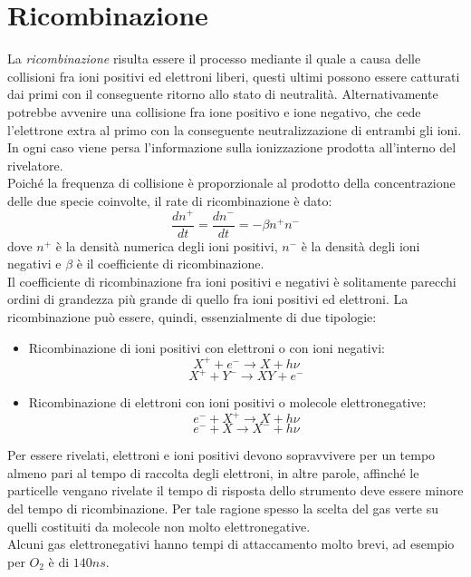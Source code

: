 \documentclass[12pt, letterpaper]{book}
\begin{document}
\section{Ricombinazione}
La \textit{ricombinazione} risulta essere il processo mediante il quale a causa delle collisioni fra ioni positivi ed elettroni liberi, questi ultimi possono essere catturati dai primi con il conseguente ritorno allo stato di neutralità. Alternativamente potrebbe avvenire una collisione fra ione positivo e ione negativo, che cede l'elettrone extra al primo con la conseguente neutralizzazione di entrambi gli ioni. In ogni caso viene persa l'informazione sulla ionizzazione prodotta all'interno del rivelatore.\\ 
Poiché la frequenza di collisione è proporzionale al prodotto della concentrazione delle due specie coinvolte, il rate di ricombinazione è dato:
$$\frac{dn^+}{dt}=\frac{dn^-}{dt}=-\beta n^+n^-$$
dove $n^+$ è la densità numerica degli ioni positivi, $n^-$ è la densità degli ioni negativi e $\beta$ è il coefficiente di ricombinazione.\\
Il coefficiente di ricombinazione fra ioni positivi e negativi è solitamente parecchi ordini di grandezza più grande di quello fra ioni positivi ed elettroni.
La ricombinazione può essere, quindi, essenzialmente di due tipologie:
\begin{itemize}
    \item Ricombinazione di ioni positivi con elettroni o con ioni negativi:
    $$X^++e^-\rightarrow X+h\nu$$
    $$X^++Y^-\rightarrow XY+e^-$$
    \item Ricombinazione di elettroni con ioni positivi o molecole elettronegative:
    $$e^-+X^+\rightarrow X+h\nu$$
    $$e^-+X\rightarrow X^-+h\nu$$
\end{itemize}
Per essere rivelati, elettroni e ioni positivi devono sopravvivere per un tempo almeno pari al tempo di raccolta degli elettroni, in altre parole, affinché le particelle vengano rivelate il tempo di risposta dello strumento deve essere minore del tempo di ricombinazione. Per tale ragione spesso la scelta del gas verte su quelli costituiti da molecole non molto elettronegative.\\
Alcuni gas elettronegativi hanno tempi di attaccamento molto brevi, ad esempio per $O_2$ è di $140 ns$.
\end{document}
